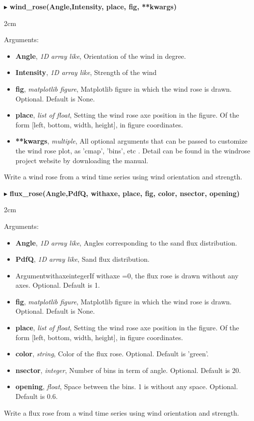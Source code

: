 \documentclass[12pt]{article}
\newenvironment{myenv}{\begin{adjustwidth}{2cm}{}}{\end{adjustwidth}}
\newcommand{\Function}[3]{\filbreak\noindent
$\blacktriangleright$ \quad\textbf{#1}
\begin{myenv}

Arguments: {#2}

{#3}
\end{myenv}
\vspace*{0.4 cm}}
\newcommand{\Argument}[3]{\noindent
\textbf{#1}, \textit{#2}, {#3}}
\begin{document}
\Function{wind\_rose(Angle,Intensity, place, fig, **kwargs)}{
\begin{itemize}
	\item \Argument{Angle}{1D array like}{Orientation of the wind in degree.}
	\item \Argument{Intensity}{1D array like}{Strength of the wind}
	\item \Argument{fig}{matplotlib figure}{Matplotlib figure in which the wind rose is drawn. Optional. Default is None.}
	\item \Argument{place}{list of float}{Setting the wind rose axe position in the figure. Of the form [left, bottom, width, height], in figure coordinates.}

	\item \Argument{**kwargs}{multiple}{All optional arguments that can be passed to customize the wind rose plot, as 'cmap', 'bins', etc . Detail can be found in the windrose project website by downloading the manual.}
\end{itemize}
}{Write a wind rose from a wind time series using  wind orientation and strength.}


\Function{flux\_rose(Angle,PdfQ, withaxe, place, fig, color, nsector, opening)}{
\begin{itemize}
	\item \Argument{Angle}{1D array like}{Angles corresponding to the sand flux distribution.}
	\item \Argument{PdfQ}{1D array like}{Sand flux distribution.}
	\item Argument{withaxe}{integer}{If withaxe =0, the flux rose is drawn without any axes. Optional. Default is 1.}
	\item \Argument{fig}{matplotlib figure}{Matplotlib figure in which the wind rose is drawn. Optional. Default is None.}
	\item \Argument{place}{list of float}{Setting the wind rose axe position in the figure. Of the form [left, bottom, width, height], in figure coordinates.}
	\item \Argument{color}{string}{Color of the flux rose. Optional. Default is 'green'.}
	\item \Argument{nsector}{integer}{Number of bins in term of angle. Optional. Default is 20.}
	\item \Argument{opening}{float}{Space between the bins. 1 is without any space. Optional. Default is 0.6.}
\end{itemize}
}{Write a flux rose from a wind time series using  wind orientation and strength.}
\end{document}
